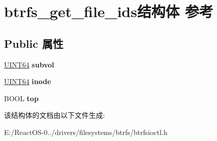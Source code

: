 \hypertarget{structbtrfs__get__file__ids}{}\section{btrfs\+\_\+get\+\_\+file\+\_\+ids结构体 参考}
\label{structbtrfs__get__file__ids}
\subsection*{Public 属性}
\begin{DoxyCompactItemize}
\item 
\mbox{\label{structbtrfs__get__file__ids_abfe432a9d02af545fb19ab1210399532}} 
\hyperlink{_processor_bind_8h_a57be03562867144161c1bfee95ca8f7c}{U\+I\+N\+T64} {\bfseries subvol}
\item 
\mbox{\label{structbtrfs__get__file__ids_ae1540654b625eb917ac751fa48b12637}} 
\hyperlink{_processor_bind_8h_a57be03562867144161c1bfee95ca8f7c}{U\+I\+N\+T64} {\bfseries inode}
\item 
\mbox{\label{structbtrfs__get__file__ids_af06461348ac62d1b09f56a86e2a80ca7}} 
B\+O\+OL {\bfseries top}
\end{DoxyCompactItemize}


该结构体的文档由以下文件生成\+:\begin{DoxyCompactItemize}
\item 
E\+:/\+React\+O\+S-\/0../drivers/filesystems/btrfs/btrfsioctl.\+h\end{DoxyCompactItemize}
